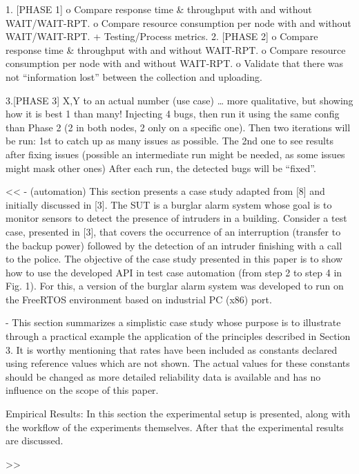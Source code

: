 \documentclass[runningheads,a4paper]{llncs}
\begin{document}
1.	[PHASE 1]
o	Compare response time \& throughput with and without WAIT/WAIT-RPT.
o	Compare resource consumption per node with and without WAIT/WAIT-RPT.
+ Testing/Process metrics.
2.	[PHASE 2]
o	Compare response time \& throughput with and without WAIT-RPT.
o	Compare resource consumption per node with and without WAIT-RPT.
o	Validate that there was not “information lost” between the collection and uploading.

3.[PHASE 3]
X,Y to an actual number (use case) … more qualitative, but showing how it is best 1 than many!
Injecting 4 bugs, then run it using the same config than Phase 2 (2 in both nodes, 2 only on a specific one). Then two iterations will be run: 1st to catch up as many issues as possible. The 2nd one to see results after fixing issues (possible an intermediate run might be needed, as some issues might mask other ones) After each run, the detected bugs will be “fixed”.

<<
- (automation) This section presents a case study adapted from [8] and initially discussed 
in [3]. The SUT is a burglar alarm system whose goal is to monitor sensors to detect
the presence of intruders in a building. Consider a test case, presented in [3],
that covers the occurrence of an interruption (transfer to the backup power)
followed by the detection of an intruder finishing with a call to the police. The
objective of the case study presented in this paper is to show how to use the
developed API in test case automation (from step 2 to step 4 in Fig. 1). For this,
a version of the burglar alarm system was developed to run on the FreeRTOS
environment based on industrial PC (x86) port.

- This section summarizes a simplistic case study whose purpose is to illustrate
through a practical example the application of the principles described in Section 3. It
is worthy mentioning that rates have been included as constants declared using
reference values which are not shown. The actual values for these constants should be
changed as more detailed reliability data is available and has no influence on the
scope of this paper.

Empirical Results: In this section the experimental setup is presented, along with the workflow of
the experiments themselves. After that the experimental results are discussed.

>>



\end{document}

